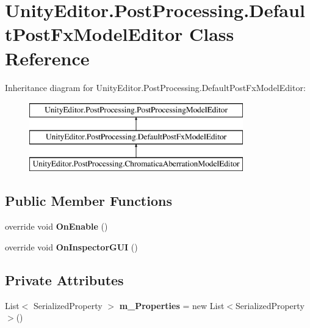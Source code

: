 \hypertarget{class_unity_editor_1_1_post_processing_1_1_default_post_fx_model_editor}{}\section{Unity\+Editor.\+Post\+Processing.\+Default\+Post\+Fx\+Model\+Editor Class Reference}
\label{class_unity_editor_1_1_post_processing_1_1_default_post_fx_model_editor}
Inheritance diagram for Unity\+Editor.\+Post\+Processing.\+Default\+Post\+Fx\+Model\+Editor\+:\begin{figure}[H]
\begin{center}
\leavevmode
\includegraphics[height=3.000000cm]{class_unity_editor_1_1_post_processing_1_1_default_post_fx_model_editor}
\end{center}
\end{figure}
\subsection*{Public Member Functions}
\begin{DoxyCompactItemize}
\item 
\mbox{\label{class_unity_editor_1_1_post_processing_1_1_default_post_fx_model_editor_a68eb49101de308934dcd63dbe26b4704}} 
override void {\bfseries On\+Enable} ()
\item 
\mbox{\label{class_unity_editor_1_1_post_processing_1_1_default_post_fx_model_editor_a2f43028e13c460b608aab5c846551016}} 
override void {\bfseries On\+Inspector\+G\+UI} ()
\end{DoxyCompactItemize}
\subsection*{Private Attributes}
\begin{DoxyCompactItemize}
\item 
\mbox{\label{class_unity_editor_1_1_post_processing_1_1_default_post_fx_model_editor_a5df21cb3f0bf8ca556ab63a7d6082089}} 
List$<$ Serialized\+Property $>$ {\bfseries m\+\_\+\+Properties} = new List$<$Serialized\+Property$>$()
\end{DoxyCompactItemize}
